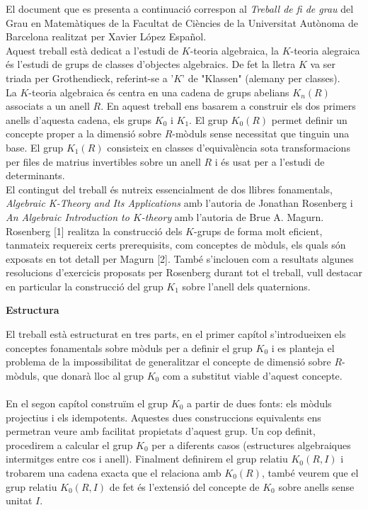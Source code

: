 \documentclass[
11pt, %
catalan, %
singlespacing, %
headsepline, %
consistentlayout, %
]{MastersDoctoralThesis} %
\theoremstyle{definition}
\begin{document}
\begin{acknowledgements}
\hspace{.5cm} El document que es presenta a continuació correspon al \textit{Treball de fi de grau} del Grau en Matemàtiques de la Facultat de Ciències de la Universitat Autònoma de Barcelona realitzat per Xavier López Español. \\

\indent Aquest treball està dedicat a l'estudi de $K$-teoria algebraica, la $K$-teoria alegraica és l'estudi de grups de classes d'objectes algebraics. De fet la lletra $K$ va ser triada per Grothendieck, referint-se a '$K$' de "Klassen" (alemany per classes).\\
La $K$-teoria algebraica és centra en una cadena de grups abelians $K_n(R)$ associats a un anell $R$. En aquest treball ens basarem a construir els dos primers anells d'aquesta cadena, els grups $K_0$ i $K_1$. El grup $K_0(R)$  permet definir un concepte proper a la dimensió sobre $R$-mòduls sense necessitat que tinguin una base. El grup $K_1(R)$ consisteix en classes d'equivalència sota transformacions per files de matrius invertibles sobre un anell $R$ i és usat per a l'estudi de determinants.\\

\indent El contingut del treball és nutreix essencialment de dos llibres fonamentals,  \textit{Algebraic K-Theory and Its Applications} amb l'autoria de Jonathan Rosenberg i \textit{An Algebraic Introduction to $K$-theory} amb l'autoria de Brue A. Magurn.  \\
Rosenberg [1] realitza la construcció dels $K$-grups de forma molt eficient, tanmateix requereix certs prerequisits, com conceptes de mòduls, els quals són exposats en tot detall per Magurn [2]. També s'inclouen com a resultats algunes resolucions d'exercicis proposats per Rosenberg durant tot el treball, vull destacar en particular la construcció del grup $K_1$ sobre l'anell dels quaternions.

 \begin{center}
 \Large \textbf{Estructura}
 \end{center}
\hspace{.25cm} El treball està estructurat en tres parts, en el primer capítol s'introdueixen els conceptes fonamentals sobre mòduls per a definir el grup $K_0$ i es planteja el problema de la impossibilitat de generalitzar el concepte de dimensió sobre $R$-mòduls, que donarà lloc al grup $K_0$ com a substitut viable d'aquest concepte.
\\\\
\indent En el segon capítol construïm el grup $K_0$ a partir de dues fonts: els mòduls projectius i els idempotents. Aquestes dues construccions equivalents ens permetran veure amb facilitat propietats d'aquest grup. Un cop definit, procedirem a calcular el grup $K_0$ per a diferents casos (estructures algebraiques intermitges entre cos i anell). Finalment definirem el grup relatiu $K_0(R,I)$ i trobarem una cadena exacta que el relaciona amb $K_0(R)$, també veurem que el grup relatiu $K_0(R,I)$ de fet és l'extensió del concepte de $K_0$ sobre anells sense unitat $I$.
\\


\end{acknowledgements}
\end{document}
